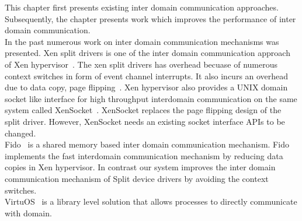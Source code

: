 This chapter first presents existing inter domain communication approaches. Subsequently, the chapter presents work which improves the performance of inter domain communication.
\\[3mm]
In the past numerous  work on inter domain communication mechanisms was presented. Xen split drivers is one of the inter domain communication approach of Xen hypervisor~\cite{Fraser04safehardware}. The xen split drivers has overhead becuase of numerous context switches in form of event channel interrupts. It also incurs an overhead due to data copy, page flipping~\cite{Zhang:2007:XHI:1516124.1516138}. Xen hypervisor also provides a UNIX domain socket like interface for high throughput interdomain communication on the same system called XenSocket~\cite{Zhang:2007:XHI:1516124.1516138}. XenSocket replaces the page flipping design of the split driver. However, XenSocket needs an existing socket interface APIs to be changed. 
\\[3mm]
Fido~\cite{Burtsev:2009:FFI:1855807.1855832} is a shared memory based inter domain communication mechanism. Fido implements the fast interdomain communication mechanism by reducing data copies in Xen hypervisor. In contrast our system improves the inter domain communication mechanism of Split device drivers by avoiding the context switches.
\\[3mm]
VirtuOS~\cite{Nikolaev:2013:VOS:2517349.2522719} is a library level solution that allows processes to directly communicate with domain. 

% 
